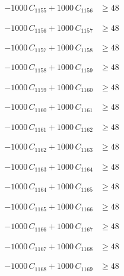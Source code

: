 \documentclass[a4paper,11pt]{article}
\begin{document}
\begin{align}
-1000\,C_{1155} + 1000\,C_{1156} &\geq 48 \nonumber
\end{align}

\begin{align}
-1000\,C_{1156} + 1000\,C_{1157} &\geq 48 \nonumber
\end{align}

\begin{align}
-1000\,C_{1157} + 1000\,C_{1158} &\geq 48 \nonumber
\end{align}

\begin{align}
-1000\,C_{1158} + 1000\,C_{1159} &\geq 48 \nonumber
\end{align}

\begin{align}
-1000\,C_{1159} + 1000\,C_{1160} &\geq 48 \nonumber
\end{align}

\begin{align}
-1000\,C_{1160} + 1000\,C_{1161} &\geq 48 \nonumber
\end{align}

\begin{align}
-1000\,C_{1161} + 1000\,C_{1162} &\geq 48 \nonumber
\end{align}

\begin{align}
-1000\,C_{1162} + 1000\,C_{1163} &\geq 48 \nonumber
\end{align}

\begin{align}
-1000\,C_{1163} + 1000\,C_{1164} &\geq 48 \nonumber
\end{align}

\begin{align}
-1000\,C_{1164} + 1000\,C_{1165} &\geq 48 \nonumber
\end{align}

\begin{align}
-1000\,C_{1165} + 1000\,C_{1166} &\geq 48 \nonumber
\end{align}

\begin{align}
-1000\,C_{1166} + 1000\,C_{1167} &\geq 48 \nonumber
\end{align}

\begin{align}
-1000\,C_{1167} + 1000\,C_{1168} &\geq 48 \nonumber
\end{align}

\begin{align}
-1000\,C_{1168} + 1000\,C_{1169} &\geq 48 \nonumber
\end{align}
\end{document}
